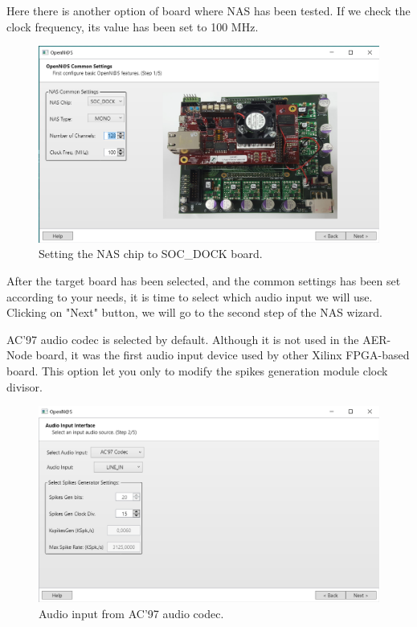 Here there is another option of board where NAS has been tested. If we check the clock frequency, its value has been set to 100 MHz.

\begin{figure}[H]
\centering
\includegraphics[width=1\textwidth]{images/Img15_VS_Step1_bis.PNG}
\caption{\label{fig:OpenNAS_s1}Setting the NAS chip to SOC\_DOCK board.}
\end{figure}

After the target board has been selected, and the common settings has been set according to your needs, it is time to select which audio input we will use. Clicking on "Next" button, we will go to the second step of the NAS wizard.

AC'97 audio codec is selected by default. Although it is not used in the AER-Node board, it was the first audio input device used by other Xilinx FPGA-based board. This option let you only to modify the spikes generation module clock divisor.

\begin{figure}[H]
\centering
\includegraphics[width=1\textwidth]{images/Img16_S2_SelectInput.PNG}
\caption{\label{fig:OpenNAS_s2_ac97}Audio input from AC'97 audio codec.}
\end{figure}

